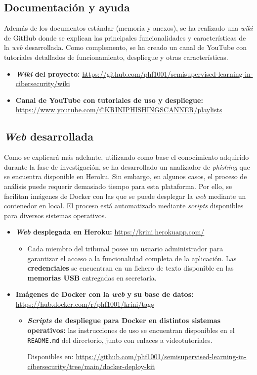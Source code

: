 \subsection{Documentación y ayuda}

Además de los documentos estándar (memoria y anexos), se ha realizado una \textit{wiki} de GitHub donde se explican las principales funcionalidades y características de la \textit{web} desarrollada. Como complemento, se ha creado un canal de YouTube con tutoriales detallados de funcionamiento, despliegue y otras características.

\begin{itemize}
	\item \textbf{\textit{Wiki} del proyecto:} 	\url{https://github.com/phf1001/semisupervised-learning-in-cibersecurity/wiki}
	\item \textbf{Canal de YouTube con tutoriales de uso y despliegue:} \url{https://www.youtube.com/@KRINIPHISHINGSCANNER/playlists}
\end{itemize}


\subsection{\textit{Web} desarrollada}

Como se explicará más adelante, utilizando como base el conocimiento adquirido durante la fase de investigación, se ha desarrollado un analizador de \textit{phishing} que se encuentra disponible en Heroku. Sin embargo, en algunos casos, el proceso de análisis puede requerir demasiado tiempo para esta plataforma. Por ello, se facilitan imágenes de Docker con las que se puede desplegar la \textit{web} mediante un contenedor en local. El proceso está automatizado mediante \textit{scripts} disponibles para diversos sistemas operativos.

\begin{itemize}
	\item \textbf{\textit{Web} desplegada en Heroku:} \url{https://krini.herokuapp.com/}
	\begin{itemize}
		\item Cada miembro del tribunal posee un usuario administrador para garantizar el acceso a la funcionalidad completa de la aplicación. Las \textbf{credenciales} se encuentran en un fichero de texto disponible en las \textbf{memorias USB} entregadas en secretaría.
	\end{itemize}
	\item \textbf{Imágenes de Docker con la \textit{web} y su base de datos:} \url{https://hub.docker.com/r/phf1001/krini/tags}
	\begin{itemize}
		\item \textbf{\textit{Scripts} de despliegue para Docker en distintos sistemas operativos:} las instrucciones de uso se encuentran disponibles en el \texttt{README.md} del directorio, junto con enlaces a videotutoriales. 
		
		Disponibles en: \url{https://github.com/phf1001/semisupervised-learning-in-cibersecurity/tree/main/docker-deploy-kit}
	\end{itemize}

\end{itemize}